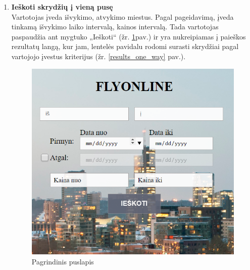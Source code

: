 \documentclass{VUMIFPSkursinis}
\begin{document}
                \begin{enumerate}[label=\textbf{U\arabic*}.]

                    \item \textbf{Ieškoti skrydžių į vieną pusę}\\
                    Vartotojas įveda išvykimo, atvykimo miestus. Pagal pageidavimą, įveda tinkamą išvykimo laiko intervalą, kainos intervalą. Tada vartotojas paspaudžia ant mygtuko „Ieškoti“ (žr. \ref{home_page_one_way}pav.) ir yra nukreipiamas į paieškos rezultatų langą, kur jam, lentelės pavidalu rodomi surasti skrydžiai pagal vartojojo įvestus kriterijus (žr. \ref{results_one_way} pav.).
                    \begin{figure}[H]
                        \centering
                        \includegraphics[scale=0.8]{img/oneway}
                        \caption{Pagrindinis puslapis}
                        \label{home_page_one_way}
                    \end{figure}
    

\end{enumerate}
\end{document}
